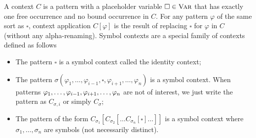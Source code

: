 \documentclass[acmsmall,review,anonymous]{acmart}
\newcommand{\Var}{\textnormal{\textsc{Var}}}
\newcommand{\ddd}{,\dots,}
\newcommand{\CSub}[1]{C_{#1}}
\newcommand{\Csigma}{\CSub{\sigma}}
\newcommand{\Csigmai}{\CSub{\sigma,i}}
\newcommand{\hole}{\square}
\begin{document}
A context $C$ is a pattern with a placeholder variable
$\hole \in \Var$ that has exactly one free occurrence
and no bound occurrence in $C$.
For any pattern $\varphi$ of the same sort as $\hole$,
context application $C[\varphi]$ is the result of
replacing $\hole$ for $\varphi$ in $C$ (without any alpha-renaming).
Symbol contexts are a special family of contexts defined as follows
\begin{itemize}
\item The pattern $\hole$ is a symbol context called the identity context;
\item The pattern
      $\sigma(\varphi_1 \ddd \varphi_{i-1}, 
              \hole , 
              \varphi_{i+1} \ddd \varphi_n)$
      is a symbol context.
      When patterns 
      $\varphi_1 \ddd \varphi_{i-1},\\ \varphi_{i+1} \ddd \varphi_n$
      are not of interest,
      we just write the pattern as $\Csigmai$ or simply $\Csigma$;
\item The pattern of the form
      $
      \CSub{\sigma_1}[\CSub{\sigma_2}[\dots  \CSub{\sigma_n}[\hole] \dots]]
      $
      is a symbol context
      where $\sigma_1 \ddd \sigma_n$ are symbols (not necessarily distinct).
\end{itemize}
\end{document}
